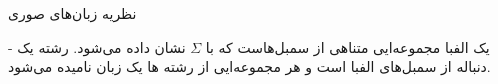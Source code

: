\begin{itemframe}{نظریه زبان‌های صوری}
\item[-]
یک الفبا
 مجموعه‌ایی متناهی از سمبل‌هاست که با  $\Sigma$ نشان داده می‌شود. رشته یک دنباله از سمبل‌های الفبا است و هر مجموعه‌ایی از رشته ها یک زبان نامیده می‌شود.

\end{itemframe}